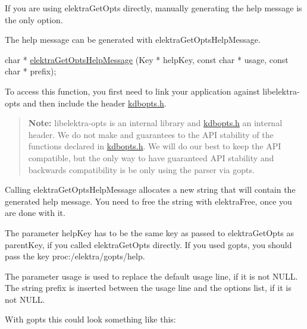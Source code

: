 If you are using {\ttfamily elektra\+Get\+Opts} directly, manually generating the help message is the only option.

The help message can be generated with {\ttfamily elektra\+Get\+Opts\+Help\+Message}.


\begin{DoxyCode}
\textcolor{keywordtype}{char} * \hyperlink{opts_8c_ac289611a114f2b2a60b740b71313a965}{elektraGetOptsHelpMessage} (Key * helpKey, \textcolor{keyword}{const} \textcolor{keywordtype}{char} * usage, \textcolor{keyword}{const} \textcolor{keywordtype}{char} * 
      prefix);
\end{DoxyCode}


To access this function, you first need to link your application against {\ttfamily libelektra-\/opts} and then include the header {\ttfamily \hyperlink{kdbopts_8h}{kdbopts.\+h}}.

\begin{quote}
{\bfseries Note\+:} {\ttfamily libelektra-\/opts} is an internal library and {\ttfamily \hyperlink{kdbopts_8h}{kdbopts.\+h}} an internal header. We do not make and guarantees to the A\+PI stability of the functions declared in {\ttfamily \hyperlink{kdbopts_8h}{kdbopts.\+h}}. We will do our best to keep the A\+PI compatible, but the only way to have guaranteed A\+PI stability and backwards compatibility is be only using the parser via {\ttfamily gopts}. \end{quote}


Calling {\ttfamily elektra\+Get\+Opts\+Help\+Message} allocates a new string that will contain the generated help message. You need to free the string with {\ttfamily elektra\+Free}, once you are done with it.

The parameter {\ttfamily help\+Key} has to be the same key as passed to {\ttfamily elektra\+Get\+Opts} as {\ttfamily parent\+Key}, if you called {\ttfamily elektra\+Get\+Opts} directly. If you used {\ttfamily gopts}, you should pass the key {\ttfamily proc\+:/elektra/gopts/help}.

The parameter {\ttfamily usage} is used to replace the default usage line, if it is not {\ttfamily N\+U\+LL}. The string {\ttfamily prefix} is inserted between the usage line and the options list, if it is not {\ttfamily N\+U\+LL}.

With {\ttfamily gopts} this could look something like this\+:


